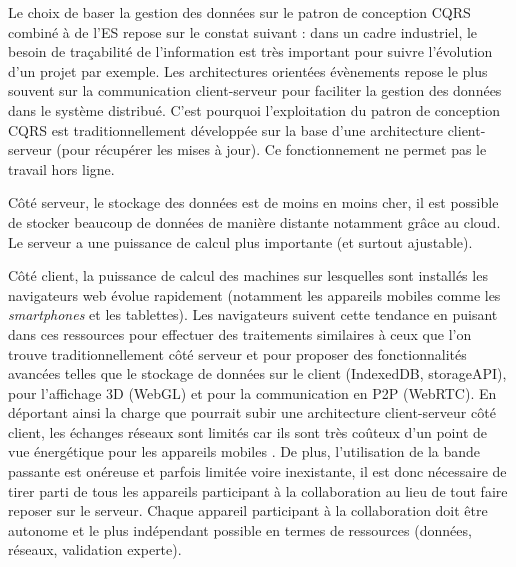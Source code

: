 %

Le choix de baser la gestion des données sur le patron de conception \gls{CQRS} 
combiné à de l'\gls{ES} repose sur le constat suivant : dans un cadre industriel, le 
besoin de traçabilité de l'information est très important pour suivre l'évolution d'un 
projet par exemple. 
Les architectures orientées évènements repose le plus souvent sur 
la communication client-serveur pour faciliter la gestion des données dans le 
système distribué. C'est pourquoi l'exploitation du patron de conception 
\gls{CQRS} est traditionnellement développée sur la base d'une architecture client-serveur  (pour récupérer les mises à jour). 
Ce fonctionnement ne permet pas le travail hors ligne.

Côté serveur, le stockage des données est de moins en moins cher, il est possible de stocker beaucoup de données de manière distante notamment 
grâce au \gls{cloud}. Le serveur a une puissance de calcul 
plus importante (et surtout ajustable).

Côté client, la puissance de calcul des machines sur lesquelles sont installés les 
navigateurs web évolue rapidement (notamment les appareils mobiles comme les 
\textit{smartphones} et les tablettes). Les navigateurs suivent cette tendance en 
puisant dans ces ressources pour effectuer des traitements similaires à ceux que 
l'on trouve traditionnellement côté serveur et pour proposer des fonctionnalités 
avancées telles que le stockage de données sur le client (IndexedDB, 
storageAPI), pour l'affichage 3D (WebGL) et pour la communication en \gls{P2P} 
(\gls{WebRTC}). En déportant ainsi la charge que pourrait subir une architecture 
client-serveur côté client, les échanges réseaux sont limités car ils 
sont très coûteux d'un point de vue énergétique pour les appareils mobiles 
\cite{Koskela2015}. De plus, l'utilisation de la bande passante est onéreuse et 
parfois limitée voire inexistante, il est donc nécessaire de tirer parti de tous les 
appareils participant à la collaboration au lieu de tout faire reposer sur le serveur. 
Chaque appareil participant à la collaboration doit être autonome et le plus 
indépendant possible en termes de ressources (données, réseaux, validation 
experte). 

